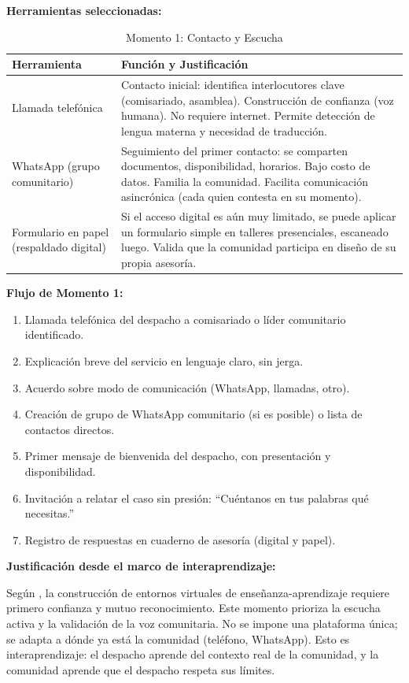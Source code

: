 ﻿\documentclass[
  spanish,
  letterpaper, oneside
]{article}
\begin{document}
\textbf{Herramientas seleccionadas:}

\begin{table}[h]
\centering
\small
\begin{tabular}{@{}lp{8cm}@{}}
\toprule
\textbf{Herramienta} & \textbf{Función y Justificación} \\
\midrule
Llamada telefónica & Contacto inicial: identifica interlocutores clave (comisariado, 
asamblea). Construcción de confianza (voz humana). No requiere internet. Permite detección 
de lengua materna y necesidad de traducción. \\
\midrule
WhatsApp (grupo comunitario) & Seguimiento del primer contacto: se comparten documentos, 
disponibilidad, horarios. Bajo costo de datos. Familia la comunidad. Facilita comunicación 
asincrónica (cada quien contesta en su momento). \\
\midrule
Formulario en papel (respaldado digital) & Si el acceso digital es aún muy limitado, 
se puede aplicar un formulario simple en talleres presenciales, escaneado luego. Valida 
que la comunidad participa en diseño de su propia asesoría. \\
\bottomrule
\end{tabular}
\caption{Momento 1: Contacto y Escucha}
\label{tab:momento1}
\end{table}

\textbf{Flujo de Momento 1:}

\begin{enumerate}
  \item Llamada telefónica del despacho a comisariado o líder comunitario identificado.
  \item Explicación breve del servicio en lenguaje claro, sin jerga.
  \item Acuerdo sobre modo de comunicación (WhatsApp, llamadas, otro).
  \item Creación de grupo de WhatsApp comunitario (si es posible) o lista de contactos directos.
  \item Primer mensaje de bienvenida del despacho, con presentación y disponibilidad.
  \item Invitación a relatar el caso sin presión: ``Cuéntanos en tus palabras qué necesitas.''
  \item Registro de respuestas en cuaderno de asesoría (digital y papel).
\end{enumerate}

\textbf{Justificación desde el marco de interaprendizaje:} 

Según \citet{bautista2016didactica}, la construcción de entornos virtuales de enseñanza-aprendizaje 
requiere primero confianza y mutuo reconocimiento. Este momento prioriza la escucha activa 
y la validación de la voz comunitaria. No se impone una plataforma única; se adapta a dónde 
ya está la comunidad (teléfono, WhatsApp). Esto es interaprendizaje: el despacho aprende 
del contexto real de la comunidad, y la comunidad aprende que el despacho respeta sus límites.
\end{document}

